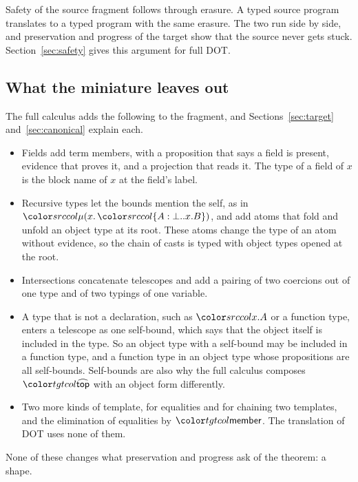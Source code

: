 Safety of the source fragment follows through erasure. A typed source program translates to a typed \FCdot program with the same erasure. The two run side by side, and preservation and progress of the target show that the source never gets stuck. Section~\ref{sec:safety} gives this argument for full DOT.

\FloatBarrier
\subsection{What the miniature leaves out}\label{sec:mini-omitted}

The full calculus adds the following to the fragment, and Sections~\ref{sec:target} and~\ref{sec:canonical} explain each.
\begin{itemize}
\item Fields add term members, with a proposition that says a field is present, evidence that proves it, and a projection that reads it. The type of a field of $x$ is the block name of $x$ at the field's label.
\item Recursive types let the bounds mention the self, as in $\dmu{x}{\dtyp{A}{\bot}{x.B}}$, and add atoms that fold and unfold an object type at its root. These atoms change the type of an atom without evidence, so the chain of casts is typed with object types opened at the root.
\item Intersections concatenate telescopes and add a pairing of two coercions out of one type and of two typings of one variable.
\item A type that is not a declaration, such as $\src{x.A}$ or a function type, enters a telescope as one self-bound, which says that the object itself is included in the type. So an object type with a self-bound may be included in a function type, and a function type in an object type whose propositions are all self-bounds. Self-bounds are also why the full calculus composes $\form{top}$ with an object form differently.
\item Two more kinds of template, for equalities and for chaining two templates, and the elimination of equalities by $\ev{member}$. The translation of DOT uses none of them.
\end{itemize}
None of these changes what preservation and progress ask of the theorem: a shape.
